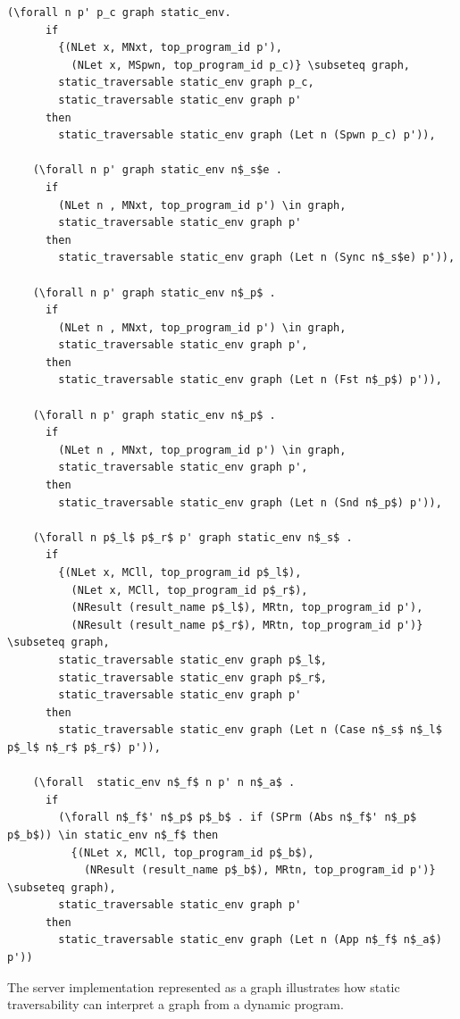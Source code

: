 \documentclass{article}
\begin{document}
\begin{lstlisting}[language=logic, mathescape]
    (\forall n p' p_c graph static_env.
      if
        {(NLet x, MNxt, top_program_id p'),
          (NLet x, MSpwn, top_program_id p_c)} \subseteq graph, 
        static_traversable static_env graph p_c, 
        static_traversable static_env graph p'
      then
        static_traversable static_env graph (Let n (Spwn p_c) p')),

    (\forall n p' graph static_env n$_s$e .
      if
        (NLet n , MNxt, top_program_id p') \in graph, 
        static_traversable static_env graph p'
      then
        static_traversable static_env graph (Let n (Sync n$_s$e) p')),

    (\forall n p' graph static_env n$_p$ .
      if
        (NLet n , MNxt, top_program_id p') \in graph, 
        static_traversable static_env graph p', 
      then
        static_traversable static_env graph (Let n (Fst n$_p$) p')),

    (\forall n p' graph static_env n$_p$ .
      if
        (NLet n , MNxt, top_program_id p') \in graph, 
        static_traversable static_env graph p', 
      then
        static_traversable static_env graph (Let n (Snd n$_p$) p')),

    (\forall n p$_l$ p$_r$ p' graph static_env n$_s$ .
      if
        {(NLet x, MCll, top_program_id p$_l$),
          (NLet x, MCll, top_program_id p$_r$),
          (NResult (result_name p$_l$), MRtn, top_program_id p'),
          (NResult (result_name p$_r$), MRtn, top_program_id p')} \subseteq graph, 
        static_traversable static_env graph p$_l$, 
        static_traversable static_env graph p$_r$,
        static_traversable static_env graph p'
      then
        static_traversable static_env graph (Let n (Case n$_s$ n$_l$ p$_l$ n$_r$ p$_r$) p')),

    (\forall  static_env n$_f$ n p' n n$_a$ .
      if
        (\forall n$_f$' n$_p$ p$_b$ . if (SPrm (Abs n$_f$' n$_p$ p$_b$)) \in static_env n$_f$ then 
          {(NLet x, MCll, top_program_id p$_b$),
            (NResult (result_name p$_b$), MRtn, top_program_id p')} \subseteq graph),
        static_traversable static_env graph p'
      then
        static_traversable static_env graph (Let n (App n$_f$ n$_a$) p'))
  \end{lstlisting}

The server implementation represented as a graph illustrates how static traversability can interpret
a graph from a dynamic program.
\end{document}
